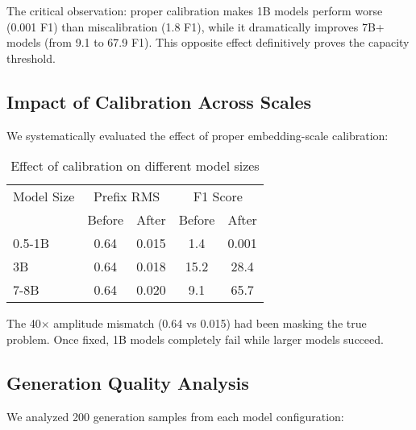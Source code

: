 \documentclass{article}
\begin{document}
The critical observation: proper calibration makes 1B models perform worse (0.001 F1) than miscalibration (1.8 F1), while it dramatically improves 7B+ models (from 9.1 to 67.9 F1). This opposite effect definitively proves the capacity threshold.

\subsection{Impact of Calibration Across Scales}

We systematically evaluated the effect of proper embedding-scale calibration:

\begin{table}[h]
\caption{Effect of calibration on different model sizes}
\label{tab:calibration_effect}
\vskip 0.15in
\begin{center}
\begin{small}
\begin{tabular}{lcccc}
\toprule
Model Size & \multicolumn{2}{c}{Prefix RMS} & \multicolumn{2}{c}{F1 Score} \\
 & Before & After & Before & After \\
\midrule
0.5-1B & 0.64 & 0.015 & 1.4 & 0.001 \\
3B & 0.64 & 0.018 & 15.2 & 28.4 \\
7-8B & 0.64 & 0.020 & 9.1 & 65.7 \\
\bottomrule
\end{tabular}
\end{small}
\end{center}
\vskip -0.1in
\end{table}

The 40$\times$ amplitude mismatch (0.64 vs 0.015) had been masking the true problem. Once fixed, 1B models completely fail while larger models succeed.

\subsection{Generation Quality Analysis}

We analyzed 200 generation samples from each model configuration:
\end{document}
